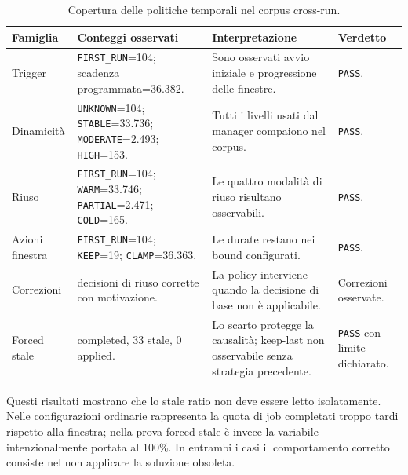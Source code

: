 \begin{table}[H]
    \centering
    \caption{Copertura delle politiche temporali nel corpus cross-run.}
    \label{tab:exp_temporalita}
    \small
    \begin{tabularx}{\textwidth}{
        >{\raggedright\arraybackslash}p{}
        >{\raggedright\arraybackslash}p{}
        >{\raggedright\arraybackslash}X
        >{\raggedright\arraybackslash}p{}
    }
        \toprule
        \textbf{Famiglia} &
        \textbf{Conteggi osservati} &
        \textbf{Interpretazione} &
        \textbf{Verdetto} \\
        \midrule
        Trigger &
        \texttt{FIRST\_RUN}=104; scadenza programmata=36.382. &
        Sono osservati avvio iniziale e progressione delle finestre. &
        \texttt{PASS}. \\
        Dinamicità &
        \texttt{UNKNOWN}=104; \texttt{STABLE}=33.736; \texttt{MODERATE}=2.493; \texttt{HIGH}=153. &
        Tutti i livelli usati dal manager compaiono nel corpus. &
        \texttt{PASS}. \\
        Riuso &
        \texttt{FIRST\_RUN}=104; \texttt{WARM}=33.746; \texttt{PARTIAL}=2.471; \texttt{COLD}=165. &
        Le quattro modalità di riuso risultano osservabili. &
        \texttt{PASS}. \\
        Azioni finestra &
        \texttt{FIRST\_RUN}=104; \texttt{KEEP}=19; \texttt{CLAMP}=36.363. &
        Le durate restano nei bound configurati. &
        \texttt{PASS}. \\
        Correzioni &
        22 decisioni di riuso corrette con motivazione. &
        La policy interviene quando la decisione di base non è applicabile. &
        Correzioni osservate. \\
        Forced stale &
        33 completed, 33 stale, 0 applied. &
        Lo scarto protegge la causalità; keep-last non osservabile senza strategia precedente. &
        \texttt{PASS} con limite dichiarato. \\
        \bottomrule
    \end{tabularx}
\end{table}

Questi risultati mostrano che lo stale ratio non deve essere letto isolatamente. Nelle configurazioni ordinarie rappresenta la quota di job completati troppo tardi rispetto alla finestra; nella prova forced-stale è invece la variabile intenzionalmente portata al 100\%. In entrambi i casi il comportamento corretto consiste nel non applicare la soluzione obsoleta.


